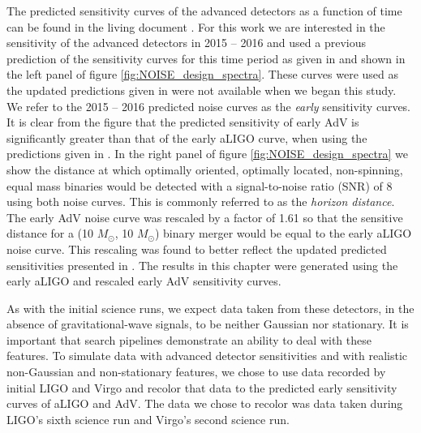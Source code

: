 The predicted sensitivity curves of the advanced detectors as a function of
time can be found in the living document
\cite{Aasi:2013wya}. For this work we are interested in the
sensitivity of the advanced detectors in 2015 -- 2016 and used a previous 
prediction of the sensitivity curves for this time period as given in
\cite{LV_early_noisecurves} and shown in the left panel of figure 
\ref{fig:NOISE_design_spectra}.
These curves were used as the updated predictions given in 
\cite{Aasi:2013wya} were not available when we began this study.
We refer to the 2015 -- 2016 predicted noise curves as the \emph{early} 
sensitivity curves.
It is clear from the figure that the predicted
sensitivity of early AdV is significantly greater than 
that of the early aLIGO curve, when using the predictions given in 
\cite{LV_early_noisecurves}. In the right panel of figure 
\ref{fig:NOISE_design_spectra} we
show the distance at which optimally oriented, optimally located,
non-spinning, equal mass binaries would be detected with a
signal-to-noise ratio (SNR) of 8 using both noise curves.
This is commonly referred to as the \emph{horizon distance}. The early AdV 
noise curve was rescaled
by a factor of 1.61 so that the sensitive distance for a
(10 $M_{\odot}$, 10 $M_{\odot}$) binary merger would be equal to the early aLIGO
noise curve. This rescaling was found to better reflect the updated predicted
sensitivities presented in \cite{Aasi:2013wya}. The results in this 
chapter were generated using the early aLIGO and rescaled early AdV sensitivity 
curves.

As with the initial science runs, we expect data taken from
these detectors, in the absence of gravitational-wave signals, to be neither
Gaussian nor stationary. It is important that search pipelines demonstrate
an ability to deal with these features. To simulate data with 
advanced detector sensitivities and with
realistic non-Gaussian and non-stationary features, we chose to use
data recorded by initial LIGO and Virgo and recolor that data to the
predicted early sensitivity curves of aLIGO and AdV. The data we
chose to recolor was data taken during LIGO's sixth science run and Virgo's
second science run.

